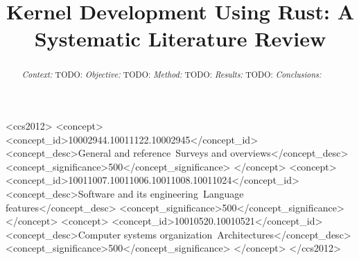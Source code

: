 \documentclass[sigconf]{acmart}
\begin{document}
\title{Kernel Development Using Rust: A Systematic Literature Review}



\renewcommand{\shortauthors}{Panter et al.}

\begin{abstract}
    \textit{Context:}
    TODO:
    \textit{Objective:}
    TODO:
    \textit{Method:}
    TODO:
    \textit{Results:}
    TODO:
    \textit{Conclusions:}
\end{abstract}

\begin{CCSXML}
<ccs2012>
<concept>
<concept_id>10002944.10011122.10002945</concept_id>
<concept_desc>General and reference~Surveys and overviews</concept_desc>
<concept_significance>500</concept_significance>
</concept>
<concept>
<concept_id>10011007.10011006.10011008.10011024</concept_id>
<concept_desc>Software and its engineering~Language features</concept_desc>
<concept_significance>500</concept_significance>
</concept>
<concept>
<concept_id>10010520.10010521</concept_id>
<concept_desc>Computer systems organization~Architectures</concept_desc>
<concept_significance>500</concept_significance>
</concept>
</ccs2012>
\end{CCSXML}






\maketitle
\end{document}
